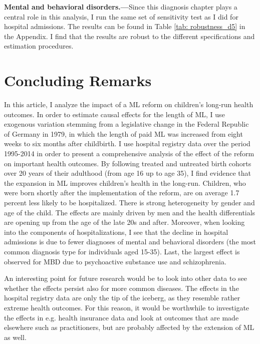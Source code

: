 \documentclass[11pt, a4paper,draft]{article} %
\begin{document}
\textbf{Mental and behavioral disorders.---}Since this diagnosis chapter plays a central role in this analysis, I run the same set of sensitivity test as I did for hospital admissions. The results can be found in Table \ref{tab: robustness_d5} in the Appendix. I find that the results are robust to the different specifications and estimation procedures.






\section{Concluding Remarks}\label{sec:conclusion}

In this article, I analyze the impact of a ML reform on children's long-run health outcomes. In order to estimate causal effects for the length of ML, I use exogenous variation stemming from a legislative change in the Federal Republic of Germany in 1979, in which the length of paid ML was increased from eight weeks to six months after childbirth. I use hospital registry data over the period 1995-2014 in order to present a comprehensive analysis of the effect of the reform on important health outcomes. By following treated and untreated birth cohorts over 20 years of their adulthood (from age 16 up to age 35), I find evidence that the expansion in ML improves children's health in the long-run. Children, who were born shortly after the implementation of the reform, are on average 1.7 percent less likely to be hospitalized. There is strong heterogeneity by gender and age of the child. The effects are mainly driven by men and the health differentials are opening up from the age of the late 20s and after. Moreover, when looking into the components of hospitalizations, I see that the decline in hospital admissions is due to fewer diagnoses of mental and behavioral disorders (the most common diagnosis type for individuals aged 15-35). Last, the largest effect is observed for MBD due to psychoactive substance use and schizophrenia. \newline


An interesting point for future research would be to look into other data to see whether the effects persist also for more common diseases. The effects in the hospital registry data are only the tip of the iceberg, as they resemble rather extreme health outcomes. For this reason, it would be worthwhile to investigate the effects in e.g. health insurance data and look at outcomes that are made elsewhere such as practitioners, but are probably affected by the extension of ML as well. \newline
\end{document}
